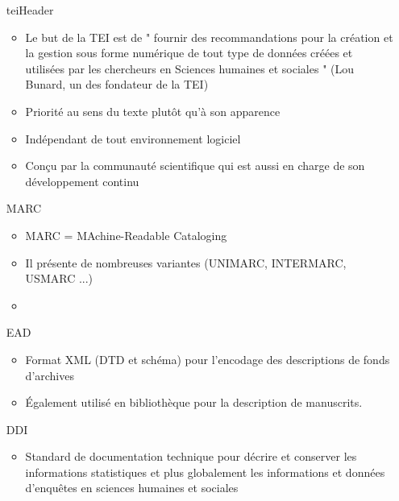 \documentclass{book}
\begin{document}
\begin{enumerate}
\begin{enumerate}
\begin{enumerate}
\begin{itemize}
            \end{itemize}
            \item [teiHeader]%
            \begin{itemize}
                \item  Le but de la TEI est de " fournir des recommandations pour la création et la gestion sous forme numérique de tout type de données créées et utilisées par les chercheurs en Sciences humaines et sociales " (Lou Bunard, un des fondateur de la TEI)
                \item Priorité au sens du texte plutôt qu'à son apparence
                \item Indépendant de tout environnement logiciel
                \item Conçu par la communauté scientifique qui est aussi en charge de son développement continu
            \end{itemize}
            \item [MARC]%
            \begin{itemize}
                \item MARC = MAchine-Readable Cataloging
                \item Il présente de nombreuses variantes (UNIMARC, INTERMARC, USMARC ...)
                \item 
            \end{itemize}
            \item [EAD]%
            \begin{itemize}
                \item Format XML (DTD et schéma) pour l’encodage des descriptions de fonds d’archives \item Également utilisé en bibliothèque pour la description de manuscrits.
            \end{itemize}
            \item [DDI]%
            \begin{itemize}
                \item Standard de documentation technique pour décrire et conserver les informations statistiques et plus globalement les informations et données d'enquêtes en sciences humaines et sociales
            \end{itemize}
        \end{enumerate}
    \end{enumerate}
\end{enumerate}
\end{document}

